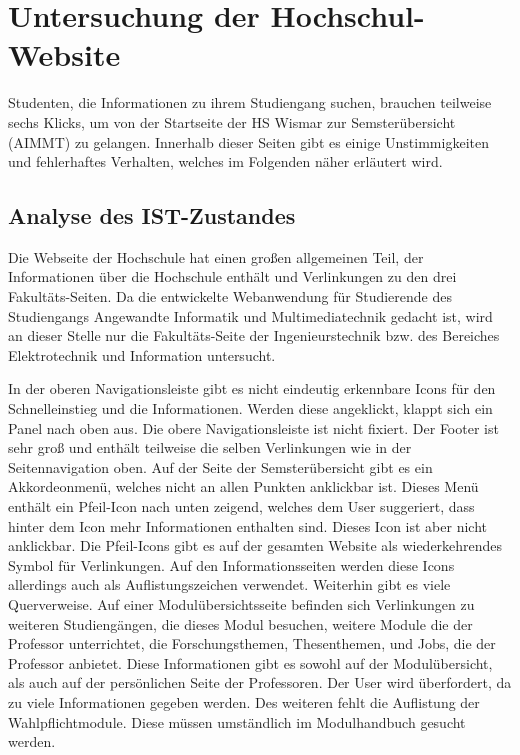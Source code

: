 \documentclass[12pt,					%
							 oneside,			%
							 a4paper,			%
							 halfparskip,		%
							 liststotoc,			%
							 bibtotoc,			%
							 fleqn,				%
							 pointlessnumbers]	%
							 {scrreprt}
\begin{document}
\chapter{Untersuchung der Hochschul-Website}	
Studenten, die Informationen zu ihrem Studiengang suchen, brauchen teilweise sechs Klicks, um von der Startseite der HS Wismar zur Semsterübersicht (AIMMT) zu gelangen. Innerhalb dieser Seiten gibt es einige Unstimmigkeiten und fehlerhaftes Verhalten, welches im Folgenden näher erläutert wird.

		\section{Analyse des IST-Zustandes}
		Die Webseite der Hochschule hat einen großen allgemeinen Teil, der Informationen über die Hochschule enthält und Verlinkungen zu den drei Fakultäts-Seiten. Da die entwickelte Webanwendung für Studierende des Studiengangs Angewandte Informatik und Multimediatechnik gedacht ist, wird an dieser Stelle nur die Fakultäts-Seite der Ingenieurstechnik bzw. des Bereiches Elektrotechnik und Information untersucht.
		
		In der oberen Navigationsleiste gibt es nicht eindeutig erkennbare Icons für den Schnelleinstieg und die Informationen. Werden diese angeklickt, klappt sich ein Panel nach oben aus. Die obere Navigationsleiste ist nicht fixiert. Der Footer ist sehr groß und enthält teilweise die selben Verlinkungen wie in der Seitennavigation oben. Auf der Seite der Semsterübersicht gibt es ein Akkordeonmenü, welches nicht an allen Punkten anklickbar ist. Dieses Menü enthält ein Pfeil-Icon nach unten zeigend, welches dem User suggeriert, dass hinter dem Icon mehr Informationen enthalten sind. Dieses Icon ist aber nicht anklickbar. Die Pfeil-Icons gibt es auf der gesamten Website als wiederkehrendes Symbol für Verlinkungen. Auf den Informationsseiten werden diese Icons allerdings auch als Auflistungszeichen verwendet. Weiterhin gibt es viele Querverweise. Auf einer Modulübersichtsseite befinden sich Verlinkungen zu weiteren Studiengängen, die dieses Modul besuchen, weitere Module die der Professor unterrichtet, die Forschungsthemen, Thesenthemen, und Jobs, die der Professor anbietet. Diese Informationen gibt es sowohl auf der Modulübersicht, als auch auf der persönlichen Seite der Professoren. Der User wird überfordert, da zu viele Informationen gegeben werden. Des weiteren fehlt die Auflistung der Wahlpflichtmodule. Diese müssen umständlich im Modulhandbuch gesucht werden. 
\end{document}
